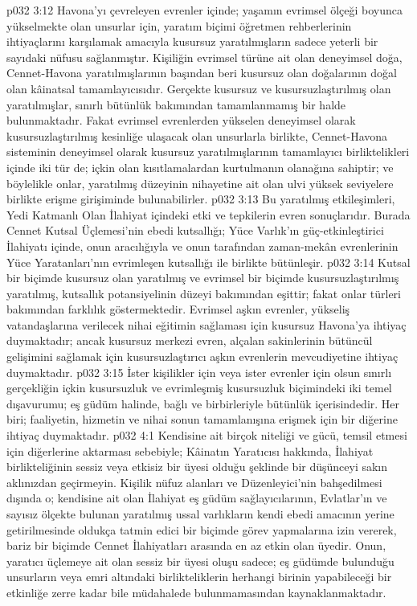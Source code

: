 \vs p032 3:12 Havona’yı çevreleyen evrenler içinde; yaşamın evrimsel ölçeği boyunca yükselmekte olan unsurlar için, yaratım biçimi öğretmen rehberlerinin ihtiyaçlarını karşılamak amacıyla kusursuz yaratılmışların sadece yeterli bir sayıdaki nüfusu sağlanmıştır. Kişiliğin evrimsel türüne ait olan deneyimsel doğa, Cennet\hyp{}Havona yaratılmışlarının başından beri kusursuz olan doğalarının doğal olan kâinatsal tamamlayıcısıdır. Gerçekte kusursuz ve kusursuzlaştırılmış olan yaratılmışlar, sınırlı bütünlük bakımından tamamlanmamış bir halde bulunmaktadır. Fakat evrimsel evrenlerden yükselen deneyimsel olarak kusursuzlaştırılmış kesinliğe ulaşacak olan unsurlarla birlikte, Cennet\hyp{}Havona sisteminin deneyimsel olarak kusursuz yaratılmışlarının tamamlayıcı birliktelikleri içinde iki tür de; içkin olan kısıtlamalardan kurtulmanın olanağına sahiptir; ve böylelikle onlar, yaratılmış düzeyinin nihayetine ait olan ulvi yüksek seviyelere birlikte erişme girişiminde bulunabilirler.
\vs p032 3:13 Bu yaratılmış etkileşimleri, Yedi Katmanlı Olan İlahiyat içindeki etki ve tepkilerin evren sonuçlarıdır. Burada Cennet Kutsal Üçlemesi’nin ebedi kutsallığı; Yüce Varlık’ın güç\hyp{}etkinleştirici İlahiyatı içinde, onun aracılığıyla ve onun tarafından zaman\hyp{}mekân evrenlerinin Yüce Yaratanları’nın evrimleşen kutsallığı ile birlikte bütünleşir.
\vs p032 3:14 Kutsal bir biçimde kusursuz olan yaratılmış ve evrimsel bir biçimde kusursuzlaştırılmış yaratılmış, kutsallık potansiyelinin düzeyi bakımından eşittir; fakat onlar türleri bakımından farklılık göstermektedir. Evrimsel aşkın evrenler, yükseliş vatandaşlarına verilecek nihai eğitimin sağlaması için kusursuz Havona’ya ihtiyaç duymaktadır; ancak kusursuz merkezi evren, alçalan sakinlerinin bütüncül gelişimini sağlamak için kusursuzlaştırıcı aşkın evrenlerin mevcudiyetine ihtiyaç duymaktadır.
\vs p032 3:15 İster kişilikler için veya ister evrenler için olsun sınırlı gerçekliğin içkin kusursuzluk ve evrimleşmiş kusursuzluk biçimindeki iki temel dışavurumu; eş güdüm halinde, bağlı ve birbirleriyle bütünlük içerisindedir. Her biri; faaliyetin, hizmetin ve nihai sonun tamamlanışına erişmek için bir diğerine ihtiyaç duymaktadır.
\vs p032 4:1 Kendisine ait birçok niteliği ve gücü, temsil etmesi için diğerlerine aktarması sebebiyle; Kâinatın Yaratıcısı hakkında, İlahiyat birlikteliğinin sessiz veya etkisiz bir üyesi olduğu şeklinde bir düşünceyi sakın aklınızdan geçirmeyin. Kişilik nüfuz alanları ve Düzenleyici’nin bahşedilmesi dışında o; kendisine ait olan İlahiyat eş güdüm sağlayıcılarının, Evlatlar’ın ve sayısız ölçekte bulunan yaratılmış ussal varlıkların kendi ebedi amacının yerine getirilmesinde oldukça tatmin edici bir biçimde görev yapmalarına izin vererek, bariz bir biçimde Cennet İlahiyatları arasında en az etkin olan üyedir. Onun, yaratıcı üçlemeye ait olan sessiz bir üyesi oluşu sadece; eş güdümde bulunduğu unsurların veya emri altındaki birlikteliklerin herhangi birinin yapabileceği bir etkinliğe zerre kadar bile müdahalede bulunmamasından kaynaklanmaktadır.
